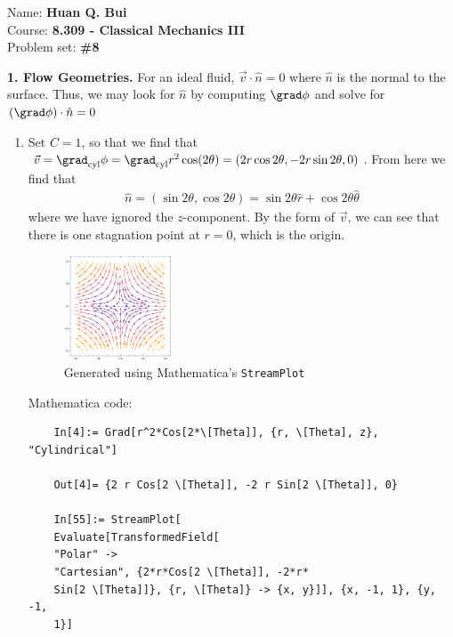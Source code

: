 \documentclass{article}
\theoremstyle{definition}
\begin{document}
	
\begin{framed}
	\noindent Name: \textbf{Huan Q. Bui}\\
	Course: \textbf{8.309 - Classical Mechanics III}\\
	Problem set: \textbf{\#8}
\end{framed}

\noindent \textbf{1. Flow Geometries.} For an ideal fluid, $\vec{v} \cdot \hat{n} = 0$ where $\hat{n}$ is the normal to the surface. Thus, we may look for $\hat{n}$ by computing $\grad \phi$ and solve for $(\grad \phi)\cdot \hat{n} = 0$
 
\begin{enumerate}[label=(\alph*)]
	\item Set $C=1$, so that we find that $\vec{v} = \grad_\text{cyl} \phi = \grad_\text{cyl} r^2\cos(2\theta) = (2r\cos2\theta, -2r\sin2\theta,0)$. From here we find that 
	\begin{align*}
	\hat{n} = (\sin 2 \theta, \cos 2 \theta) = \sin 2 \theta \hat{r} + \cos 2 \theta \hat{\theta}
	\end{align*}
	where we have ignored the $z$-component. By the form of $\vec{v}$, we can see that there is one stagnation point at $r=0$, which is the origin. 

	\begin{figure}[!htb]
		\centering
		\includegraphics[width=0.3\textwidth]{1a.eps}
		\caption{Generated using Mathematica's \texttt{StreamPlot}}
	\end{figure}
	
	Mathematica code:
	\begin{lstlisting}
	In[4]:= Grad[r^2*Cos[2*\[Theta]], {r, \[Theta], z}, "Cylindrical"]
	
	Out[4]= {2 r Cos[2 \[Theta]], -2 r Sin[2 \[Theta]], 0}
	
	In[55]:= StreamPlot[
	Evaluate[TransformedField[
	"Polar" -> 
	"Cartesian", {2*r*Cos[2 \[Theta]], -2*r* 
	Sin[2 \[Theta]]}, {r, \[Theta]} -> {x, y}]], {x, -1, 1}, {y, -1, 
	1}]
	\end{lstlisting}
	
	
	

\end{enumerate}
\end{document}
